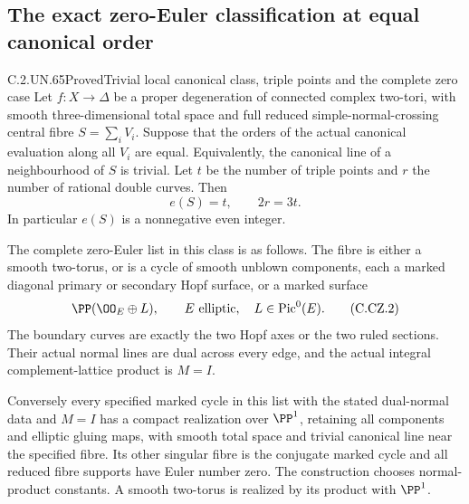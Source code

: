 \subsection{The exact zero-Euler classification at equal canonical order}

\begin{statement}{C.2.UN.65}{Proved}{Trivial local canonical class, triple points and the complete zero case}
Let $f:X\to\Delta$ be a proper degeneration of connected complex
two-tori, with smooth three-dimensional total space and full
reduced simple-normal-crossing central fibre
$S=\sum_iV_i$. Suppose that the orders of the actual canonical
evaluation along all $V_i$ are equal. Equivalently, the canonical
line of a neighbourhood of $S$ is trivial. Let $t$ be the number
of triple points and $r$ the number of rational double curves.
Then
\[
                         e(S)=t,\qquad 2r=3t.
\tag{C.CZ.1}
\]
In particular $e(S)$ is a nonnegative even integer.

The complete zero-Euler list in this class is as follows.
The fibre is either a smooth two-torus, or is a cycle of smooth
unblown components, each a marked diagonal primary or secondary
Hopf surface, or a marked surface
\[
                   \PP(\OO_E\oplus L),
          \qquad E\text{ elliptic},\quad L\in\operatorname{Pic}^0(E).
\tag{C.CZ.2}
\]
The boundary curves are exactly the two Hopf axes or the two
ruled sections. Their actual normal lines are dual across
every edge, and the actual integral complement-lattice product
is $M=I$.

Conversely every specified marked cycle in this list with
the stated dual-normal data and $M=I$ has a compact realization
over $\PP^1$, retaining all components and elliptic gluing
maps, with smooth total space and trivial canonical line
near the specified fibre. Its other singular fibre is the
conjugate marked cycle and all reduced fibre supports have
Euler number zero. The construction chooses normal-product
constants. A smooth two-torus is realized by its product
with $\PP^1$.
\end{statement}

